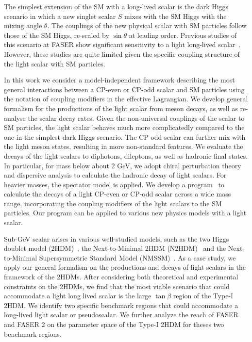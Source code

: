 \documentclass[letterpaper,11pt]{article}
\begin{document}
The simplest extension of the SM with a long-lived scalar is the dark Higgs scenario in which a new singlet scalar $S$ mixes with the SM Higgs with the mixing angle $\theta$.   The couplings of the new physical scalar with SM particles follow those of the SM Higgs, 
re-scaled by $\sin\theta$ at leading order. Previous studies of this scenario at FASER show significant sensitivity to a light long-lived   scalar~\cite{Feng:2017vli, Feng:2018pew, FASER:2018eoc, Kling:2021fwx}.  However,  these studies are quite limited given the specific coupling structure of the light scalar with SM particles.

In this work we consider a model-independent framework describing the most general interactions between a CP-even or CP-odd scalar and SM particles using the notation of coupling modifiers in the effective Lagrangian. We develop general formalism for  the productions of the light scalar from meson decays, as well as  re-analyse the scalar decay rates. Given the  non-universal couplings of the scalar to SM particles, the light scalar behaves much more complicatedly compared to the one in the simplest dark Higgs scenario. The CP-odd scalar can further mix with the light meson states, resulting in more non-standard features.    We evaluate the decays of the light scalars to diphotons, dileptons, as well as hadronic final states.    In particular, for mass below about 2 GeV, we adopt chiral perturbation theory  and dispersive analysis to calculate the hadronic decay of   light scalars.   For heavier masses, the spectator model is applied.  We  develop a  program~\cite{LSDedcay} to calculate the decays of a light CP-even or CP-odd scalar across a wide mass range, incorporating the coupling modifiers of the light scalars to the SM particles.   Our program can be applied to various new physics models with a light scalar. 

Sub-GeV scalar arises in various well-studied models, such as the  two Higgs doublet model (2HDM)~\cite{Cherchiglia:2017uwv}, the Next-to-Minimal
2HDM (N2HDM)~\cite{Liu:2020qgx} and the Next-to-Minimal Supersymmetric Standard Model (NMSSM)~\cite{Domingo:2016yih}.  As a case study, we apply our general formalism on the  productions and decays of light scalars in the framework of the 2HDMs. After considering both theoretical and experimental constraints on the 2HDMs, we find that the most viable scenario that could accommodate a light long lived scalar is the large $\tan\beta$ region of the Type-I 2HDM.  We  identify two specific benchmark regions that could accommodate a long-lived light scalar or pseudoscalar.  We  further analyze the reach of FASER and FASER 2 on the parameter space of the Type-I 2HDM for theses two benchmark regions. 
\end{document}

